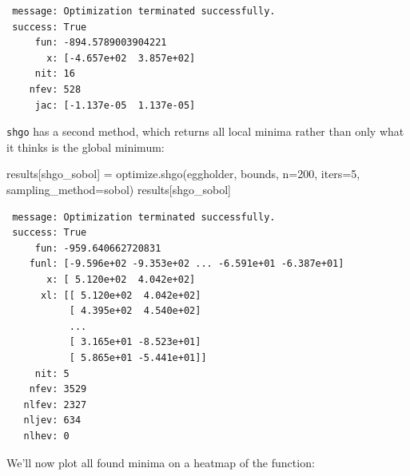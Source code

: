 \documentclass[
  letterpaper,
  DIV=11,
  numbers=noendperiod]{scrreprt}
\newenvironment{Shaded}{\begin{snugshade}}{\end{snugshade}}
\newcommand{\DecValTok}[1]{\textcolor[rgb]{0.68,0.00,0.00}{#1}}
\newcommand{\NormalTok}[1]{\textcolor[rgb]{0.00,0.23,0.31}{#1}}
\newcommand{\OperatorTok}[1]{\textcolor[rgb]{0.37,0.37,0.37}{#1}}
\newcommand{\StringTok}[1]{\textcolor[rgb]{0.13,0.47,0.30}{#1}}
\begin{document}
\begin{verbatim}
 message: Optimization terminated successfully.
 success: True
     fun: -894.5789003904221
       x: [-4.657e+02  3.857e+02]
     nit: 16
    nfev: 528
     jac: [-1.137e-05  1.137e-05]
\end{verbatim}

\texttt{shgo} has a second method, which returns all local minima rather
than only what it thinks is the global minimum:

\begin{Shaded}
\begin{Highlighting}[]
\NormalTok{results[}\StringTok{\textquotesingle{}shgo\_sobol\textquotesingle{}}\NormalTok{] }\OperatorTok{=}\NormalTok{ optimize.shgo(eggholder, bounds, n}\OperatorTok{=}\DecValTok{200}\NormalTok{, iters}\OperatorTok{=}\DecValTok{5}\NormalTok{,}
\NormalTok{                                      sampling\_method}\OperatorTok{=}\StringTok{\textquotesingle{}sobol\textquotesingle{}}\NormalTok{)}
\NormalTok{results[}\StringTok{\textquotesingle{}shgo\_sobol\textquotesingle{}}\NormalTok{]}
\end{Highlighting}
\end{Shaded}

\begin{verbatim}
 message: Optimization terminated successfully.
 success: True
     fun: -959.640662720831
    funl: [-9.596e+02 -9.353e+02 ... -6.591e+01 -6.387e+01]
       x: [ 5.120e+02  4.042e+02]
      xl: [[ 5.120e+02  4.042e+02]
           [ 4.395e+02  4.540e+02]
           ...
           [ 3.165e+01 -8.523e+01]
           [ 5.865e+01 -5.441e+01]]
     nit: 5
    nfev: 3529
   nlfev: 2327
   nljev: 634
   nlhev: 0
\end{verbatim}

We'll now plot all found minima on a heatmap of the function:
\end{document}
